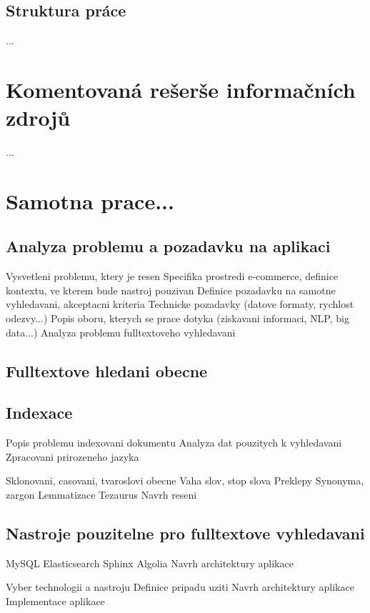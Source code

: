 \documentclass[FM,DP]{tulthesis}
\begin{document}
\section{Struktura práce}
...


\chapter{Komentovaná rešerše informačních zdrojů}
...


\chapter{Samotna prace...}

\section{Analyza problemu a pozadavku na aplikaci}

Vysvetleni problemu, ktery je resen
Specifika prostredi e-commerce, definice kontextu, ve kterem bude nastroj pouzivan
Definice pozadavku na samotne vyhledavani, akceptacni kriteria
Technicke pozadavky (datove formaty, rychlost odezvy...)
Popis oboru, kterych se prace dotyka (ziskavani informaci, NLP, big data...)
Analyza problemu fulltextoveho vyhledavani

\section{Fulltextove hledani obecne}

\section{Indexace}

Popis problemu indexovani dokumentu
Analyza dat pouzitych k vyhledavani
Zpracovani prirozeneho jazyka

Sklonovani, casovani, tvaroslovi obecne
Vaha slov, stop slova
Preklepy
Synonyma, zargon
Lemmatizace
Tezaurus
Navrh reseni

\section{Nastroje pouzitelne pro fulltextove vyhledavani}

MySQL
Elasticsearch
Sphinx
Algolia
Navrh architektury aplikace

Vyber technologii a nastroju
Definice pripadu uziti
Navrh architektury aplikace
Implementace aplikace
\end{document}
